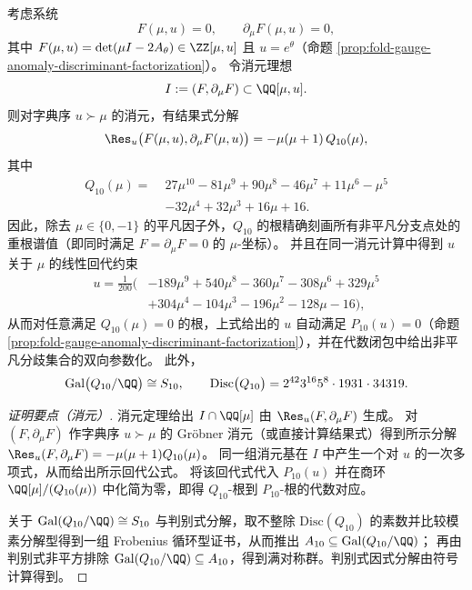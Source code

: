 \begin{proposition}\label{prop:fold-gauge-anomaly-Q10-tschirnhaus}
考虑系统
\[
F(\mu,u)=0,\qquad \partial_{\mu}F(\mu,u)=0,
\]
其中 \(F(\mu,u)=\det(\mu I-2A_{\theta})\in\ZZ[\mu,u]\) 且 \(u=e^{\theta}\)（命题 \ref{prop:fold-gauge-anomaly-discriminant-factorization}）。
令消元理想
\[
I:=(F,\partial_{\mu}F)\subset \QQ[\mu,u].
\]
则对字典序 \(u\succ \mu\) 的消元，有结果式分解
\[
\Res_{u}\bigl(F(\mu,u),\partial_{\mu}F(\mu,u)\bigr)=-\mu(\mu+1)\,Q_{10}(\mu),
\]
其中
\[
\begin{aligned}
Q_{10}(\mu)=\;&27\mu^{10}-81\mu^{9}+90\mu^{8}-46\mu^{7}+11\mu^{6}-\mu^{5}\\
&-32\mu^{4}+32\mu^{3}+16\mu+16.
\end{aligned}
\]
因此，除去 \(\mu\in\{0,-1\}\) 的平凡因子外，\(Q_{10}\) 的根精确刻画所有非平凡分支点处的重根谱值（即同时满足 \(F=\partial_{\mu}F=0\) 的 \(\mu\)-坐标）。
并且在同一消元计算中得到 \(u\) 关于 \(\mu\) 的线性回代约束
\[
\begin{aligned}
u=\frac{1}{200}\bigl(&-189\mu^{9}+540\mu^{8}-360\mu^{7}-308\mu^{6}+329\mu^{5}\\
&+304\mu^{4}-104\mu^{3}-196\mu^{2}-128\mu-16\bigr),
\end{aligned}
\]
从而对任意满足 \(Q_{10}(\mu)=0\) 的根，上式给出的 \(u\) 自动满足 \(P_{10}(u)=0\)（命题 \ref{prop:fold-gauge-anomaly-discriminant-factorization}），并在代数闭包中给出非平凡分歧集合的双向参数化。
此外，
\[
\mathrm{Gal}\bigl(Q_{10}/\QQ\bigr)\cong S_{10},\qquad
\mathrm{Disc}\bigl(Q_{10}\bigr)=2^{42}3^{16}5^{8}\cdot 1931\cdot 34319.
\]
\end{proposition}
\begin{proof}[证明要点（消元）]
消元定理给出 \(I\cap\QQ[\mu]\) 由 \(\Res_{u}(F,\partial_{\mu}F)\) 生成。
对 \((F,\partial_{\mu}F)\) 作字典序 \(u\succ\mu\) 的 Gr\"obner 消元（或直接计算结果式）得到所示分解
\(
\Res_{u}(F,\partial_{\mu}F)=-\mu(\mu+1)Q_{10}(\mu)
\)。
同一组消元基在 \(I\) 中产生一个对 \(u\) 的一次多项式，从而给出所示回代公式。
将该回代式代入 \(P_{10}(u)\) 并在商环 \(\QQ[\mu]/(Q_{10}(\mu))\) 中化简为零，即得 \(Q_{10}\)-根到 \(P_{10}\)-根的代数对应。
\par
关于 \(\mathrm{Gal}(Q_{10}/\QQ)\cong S_{10}\) 与判别式分解，取不整除 \(\mathrm{Disc}(Q_{10})\) 的素数并比较模素分解型得到一组 Frobenius 循环型证书，从而推出 \(A_{10}\subseteq \mathrm{Gal}(Q_{10}/\QQ)\)；
再由判别式非平方排除 \(\mathrm{Gal}(Q_{10}/\QQ)\subseteq A_{10}\)，得到满对称群。判别式因式分解由符号计算得到。
\end{proof}

